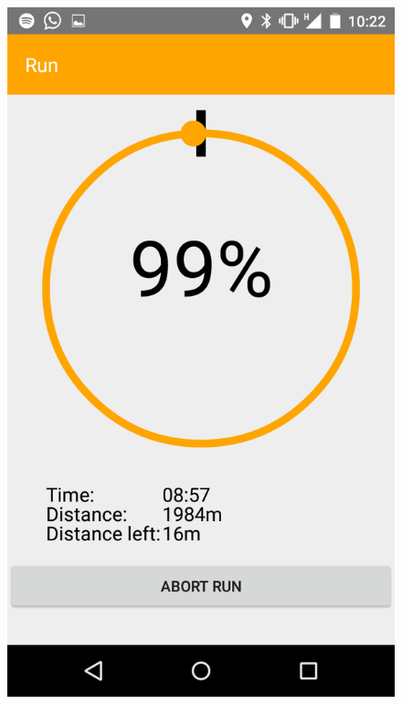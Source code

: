 \begin{figure}[!h]
\centering
\begin{minipage}{.4\textwidth}
  \centering
  \includegraphics[width=.8\linewidth]{abb/bsp/bsp13}
  \label{fig:bsp13}
\end{minipage}
\begin{minipage}{.4\textwidth}
  \centering

\end{minipage}
\end{figure}
